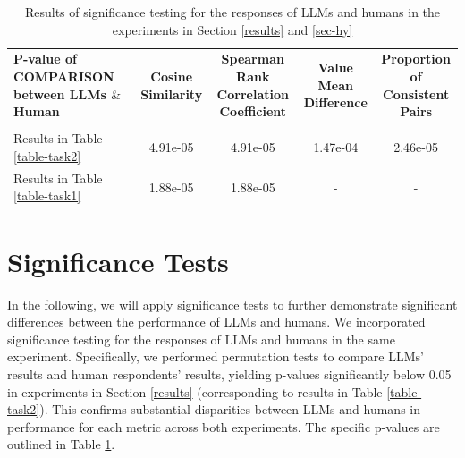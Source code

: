 \documentclass{article}
\theoremstyle{plain}
\theoremstyle{definition}
\theoremstyle{remark}
\begin{document}
\begin{CJK*}{UTF8}{gbsn}
\begin{table}[h]
\caption{\label{table-sf}Results of significance testing for the responses of LLMs and humans in the experiments in Section \ref{results} and \ref{sec-hy}}
\vskip 0.15in
\centering
\begin{tabular}{lcccc}
\toprule
\multirowcell{2}{\bf P-value of COMPARISON\\\bf between LLMs $\&$ Human} & \multirowcell{2}{\bf Cosine \\\bf Similarity} & \multirowcell{2}{\bf Spearman Rank\\\bf Correlation Coefficient} & \multirowcell{2}{\bf Value Mean\\\bf Difference} & \multirowcell{2}{\bf Proportion of\\\bf Consistent Pairs} \\
             &  &  &  &   \\
\midrule
Results in Table \ref{table-task2}    & 4.91e-05 & 4.91e-05 & 1.47e-04 & 2.46e-05  \\
Results in Table \ref{table-task1}    & 1.88e-05 & 1.88e-05 & - & -  \\
\bottomrule
\end{tabular}
\vskip -0.1in
\end{table}
\fi

\section{Significance Tests} \label{sf}
In the following, we will apply significance tests to further demonstrate significant differences between the performance of LLMs and humans. We incorporated significance testing for the responses of LLMs and humans in the same experiment. Specifically, we performed permutation tests to compare LLMs' results and human respondents' results, yielding p-values significantly below 0.05 in experiments in Section \ref{results} (corresponding to results in Table \ref{table-task2}). This confirms substantial disparities between LLMs and humans in performance for each metric across both experiments. The specific p-values are outlined in Table \ref{table-sf}.



\end{CJK*}
\end{document}
